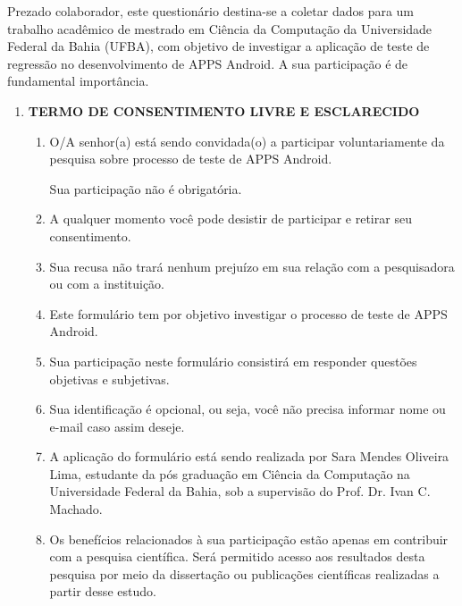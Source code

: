 \appendix
{}\label{sec:formulariopesquisa}

Prezado colaborador, este questionário destina-se a coletar dados para um trabalho acadêmico de mestrado em Ciência da Computação da Universidade Federal da Bahia (UFBA), com objetivo de investigar a aplicação de teste de regressão no desenvolvimento de \ac{APPS} Android. A sua participação é de fundamental importância.


\begin{enumerate}[label=\bf A\arabic*,leftmargin=1.8cm]

    \item \textbf{TERMO DE CONSENTIMENTO LIVRE E ESCLARECIDO}
    


    \begin{enumerate}[label= \arabic*]
    
        \item O/A senhor(a) está sendo convidada(o) a participar voluntariamente da pesquisa sobre processo de teste de \ac{APPS} Android.

        \iten Sua participação não é obrigatória.

        \item A qualquer momento você pode desistir de participar e retirar seu consentimento.

        \item Sua recusa não trará nenhum prejuízo em sua relação com a pesquisadora ou com a instituição.

        \item Este formulário tem por objetivo investigar o processo de teste de \ac{APPS} Android.

        \item Sua participação neste formulário consistirá em responder questões objetivas e subjetivas.
 
        \item Sua identificação é opcional, ou seja, você não precisa informar nome ou e-mail caso assim deseje.

        \item A aplicação do formulário está sendo realizada por Sara Mendes Oliveira Lima, estudante da pós graduação em Ciência da Computação na Universidade Federal da Bahia, sob a supervisão do Prof. Dr. Ivan C. Machado.

        \item Os benefícios relacionados à sua participação estão apenas em contribuir com a pesquisa científica. Será permitido acesso aos resultados desta pesquisa por meio da dissertação ou publicações científicas realizadas a partir desse estudo.


\end{enumerate}
\end{enumerate}
